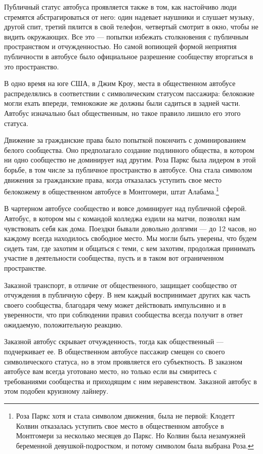\documentclass[12pt]{book}
\begin{document}
Публичный статус автобуса проявляется также в том, как настойчиво люди стремятся абстрагироваться от него: один надевает наушники и слушает музыку, другой спит, третий пялится в свой телефон, четвертый смотрит в окно, чтобы не видить окружающих. Все это --- попытки избежать столкновения с публичным пространством и отчужденностью. Но самой вопиющей формой неприятия публичности в автобусе было официальное разрешение сообществу вторгаться в это пространство.

В одно время на юге США, в Джим Кроу, места в общественном автобусе распределялись в соответствии с символическим статусом пассажира: белокожие могли ехать впереди, темнокожие же должны были садиться в задней части. Автобус изначально был общественным, но такое правило лишило его этого статуса.

Движение за гражданские права было попыткой покончить с доминированием белого сообщества. Оно предполагало создание подлинного общества, в котором ни одно сообщество не доминирует над другим. Роза Паркс была лидером в этой борьбе, в том числе за публичное пространство в автобусе. Она стала символом движения за гражданские права, когда отказалась уступить свое место белокожему в общественном автобусе в Монтгомери, штат Алабама.\footnote{Роза Паркс хотя и стала символом движения, была не первой: Клодетт Колвин отказалась уступить свое место в общественном автобусе в Монтгомери за несколько месяцев до Паркс. Но Колвин была незамужней беременной девушкой-подростком, и потому символом была выбрана Роза.}

В чартерном автобусе сообщество и вовсе доминирует над публичной сферой. Автобус, в котором мы с командой колледжа ездили на матчи, позволял нам чувствовать себя как дома. Поездки бывали довольно долгими --- до 12 часов, но каждому всегда находилось свободное место. Мы могли быть уверены, что будем сидеть там, где захотим и общаться с теми, с кем захотим, продолжая принимать участие в деятельности сообщества, пусть и в таком вот ограниченном пространстве.

Заказной транспорт, в отличие от общественного, защищает сообщество от отчуждения в публичную сферу. В нем каждый воспринимает других как часть своего сообщества, благодаря чему может действовать импульсивно и в уверенности, что при соблюдении правил сообщества всегда получит в ответ ожидаемую, положительную реакцию.

Заказной автобус скрывает отчужденность, тогда как общественный --- подчеркивает ее. В общественном автобусе пассажир смещен со своего символического статуса, но в этом проявляется его субъектность. В заказном автобусе вам всегда уготовано место, но только если вы смиритесь с требованиями сообщества и приходящим с ним неравенством. Заказной автобус в этом подобен круизному лайнеру.
\end{document}
